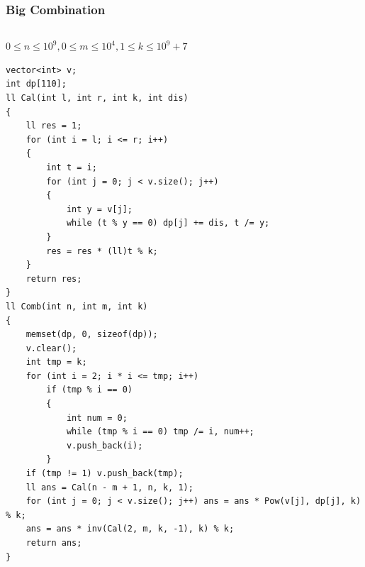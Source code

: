 \documentclass[twoside]{article}
\begin{document}
\subsubsection{Big Combination}
\begin{lstlisting}
\end{lstlisting}
$0 \leq n \leq 10^9, 0 \leq m \leq 10^4, 1 \leq k \leq 10^9+7$
\begin{lstlisting}
vector<int> v;
int dp[110];
ll Cal(int l, int r, int k, int dis)
{
    ll res = 1;
    for (int i = l; i <= r; i++)
    {
        int t = i;
        for (int j = 0; j < v.size(); j++)
        {
            int y = v[j];
            while (t % y == 0) dp[j] += dis, t /= y;
        }
        res = res * (ll)t % k;
    }
    return res;
}
ll Comb(int n, int m, int k)
{
    memset(dp, 0, sizeof(dp));
    v.clear();
    int tmp = k;
    for (int i = 2; i * i <= tmp; i++)
        if (tmp % i == 0)
        {
            int num = 0;
            while (tmp % i == 0) tmp /= i, num++;
            v.push_back(i);
        }
    if (tmp != 1) v.push_back(tmp);
    ll ans = Cal(n - m + 1, n, k, 1);
    for (int j = 0; j < v.size(); j++) ans = ans * Pow(v[j], dp[j], k) % k;
    ans = ans * inv(Cal(2, m, k, -1), k) % k;
    return ans;
}
\end{lstlisting}
\end{document}
